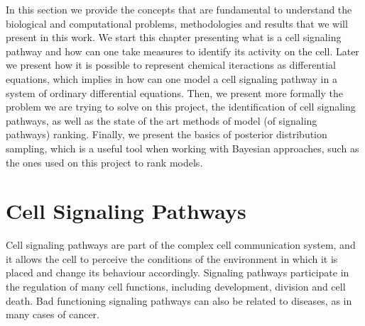 
In this section we provide the concepts that are fundamental to 
understand the biological and computational problems, methodologies and
results that we will present in this work. We start this chapter 
presenting what is a cell signaling pathway and how can one take 
measures to identify its activity on the cell. Later we present how 
it is possible to represent chemical iteractions as differential 
equations, which implies in how can one model a cell signaling pathway
in a system of ordinary differential equations. Then, we present 
more formally the problem we are trying to solve on this project, the
identification of cell signaling pathways, as well as the state of the
art methods of model (of signaling pathways) ranking. Finally, we 
present the basics of posterior distribution sampling, which is a useful
tool when working with Bayesian approaches, such as the ones used on
this project to rank models.

\section{Cell Signaling Pathways}
Cell signaling pathways are part of the complex cell communication 
system, and it allows the cell to perceive the conditions of the 
environment in which it is placed and change its behaviour accordingly.
Signaling pathways participate in the regulation of many cell functions,
including development, division and cell death. Bad functioning 
signaling pathways can also be related to diseases, as in many cases of
cancer.

